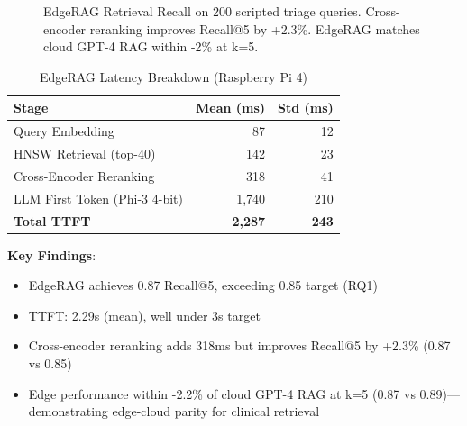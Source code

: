 \documentclass[conference,compsoc]{IEEEtran}
\begin{document}
\begin{figure}[h]
    \centering
    \caption{EdgeRAG Retrieval Recall on 200 scripted triage queries. Cross-encoder reranking improves Recall@5 by +2.3\%. EdgeRAG matches cloud GPT-4 RAG within -2\% at k=5.}
    \label{fig:edgerag_recall}
\end{figure}

\begin{table}[h]
\centering
\caption{EdgeRAG Latency Breakdown (Raspberry Pi 4)}
\label{tab:edgerag_latency}
\footnotesize
\begin{tabular}{@{}lrr@{}}
\toprule
\textbf{Stage} & \textbf{Mean (ms)} & \textbf{Std (ms)} \\ \midrule
Query Embedding & 87 & 12 \\
HNSW Retrieval (top-40) & 142 & 23 \\
Cross-Encoder Reranking & 318 & 41 \\
LLM First Token (Phi-3 4-bit) & 1,740 & 210 \\
\midrule
\textbf{Total TTFT} & \textbf{2,287} & \textbf{243} \\
\bottomrule
\end{tabular}
\end{table}

\textbf{Key Findings}:
\begin{itemize}
    \item EdgeRAG achieves 0.87 Recall@5, exceeding 0.85 target (RQ1)
    \item TTFT: 2.29s (mean), well under 3s target
    \item Cross-encoder reranking adds 318ms but improves Recall@5 by +2.3\% (0.87 vs 0.85)
    \item Edge performance within -2.2\% of cloud GPT-4 RAG at k=5 (0.87 vs 0.89)—demonstrating edge-cloud parity for clinical retrieval
\end{itemize}
\end{document}
